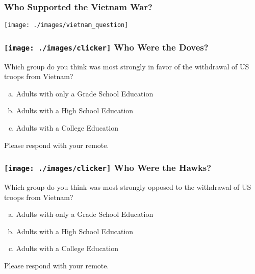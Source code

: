 \begin{frame}
\frametitle{Who Supported the Vietnam War?}
\begin{center}
\texttt{[image: ./images/vietnam\_question]}
\end{center}



\end{frame}

\begin{frame}
\frametitle{\texttt{[image: ./images/clicker]} \hfill Who Were the Doves?}
Which group do you think was most strongly \alert{in favor of} the withdrawal of US troops from Vietnam?
\begin{enumerate}[(a)]
	\item Adults with only a Grade School Education
	\item Adults with a High School Education
	\item Adults with a College Education
\end{enumerate}
\vspace{2em}
Please respond with your remote.

\end{frame}

\begin{frame}
\frametitle{\texttt{[image: ./images/clicker]} \hfill Who Were the Hawks?}
Which group do you think was most strongly \alert{opposed to} the withdrawal of US troops from Vietnam?
\begin{enumerate}[(a)]
	\item Adults with only a Grade School Education
	\item Adults with a High School Education
	\item Adults with a College Education
\end{enumerate}
\vspace{2em}
Please respond with your remote.

\end{frame}
%
%

